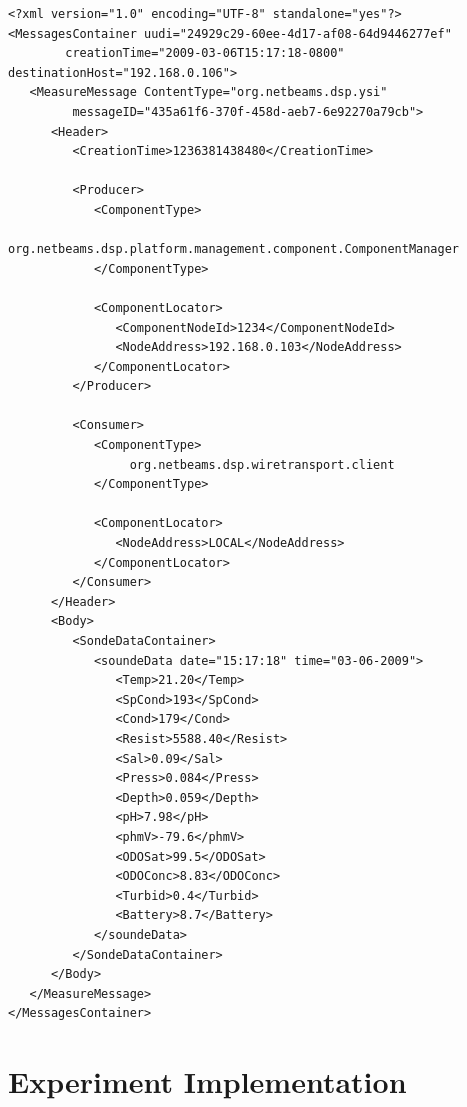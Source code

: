 \begin{lstlisting}
<?xml version="1.0" encoding="UTF-8" standalone="yes"?>
<MessagesContainer uudi="24929c29-60ee-4d17-af08-64d9446277ef"
        creationTime="2009-03-06T15:17:18-0800" destinationHost="192.168.0.106">
   <MeasureMessage ContentType="org.netbeams.dsp.ysi"
         messageID="435a61f6-370f-458d-aeb7-6e92270a79cb">
      <Header>
         <CreationTime>1236381438480</CreationTime>
         
         <Producer>   
            <ComponentType>
                 org.netbeams.dsp.platform.management.component.ComponentManager
            </ComponentType>
            
            <ComponentLocator>
               <ComponentNodeId>1234</ComponentNodeId>
               <NodeAddress>192.168.0.103</NodeAddress>
            </ComponentLocator>
         </Producer>
         
         <Consumer>
            <ComponentType>
                 org.netbeams.dsp.wiretransport.client
            </ComponentType>
            
            <ComponentLocator>
               <NodeAddress>LOCAL</NodeAddress>
            </ComponentLocator>
         </Consumer>
      </Header>
      <Body>
         <SondeDataContainer>
            <soundeData date="15:17:18" time="03-06-2009">  
               <Temp>21.20</Temp>
               <SpCond>193</SpCond>
               <Cond>179</Cond>
               <Resist>5588.40</Resist>
               <Sal>0.09</Sal>
               <Press>0.084</Press>
               <Depth>0.059</Depth>
               <pH>7.98</pH>
               <phmV>-79.6</phmV>
               <ODOSat>99.5</ODOSat>
               <ODOConc>8.83</ODOConc>
               <Turbid>0.4</Turbid>
               <Battery>8.7</Battery>
            </soundeData>
         </SondeDataContainer>
      </Body>
   </MeasureMessage>
</MessagesContainer>
\end{lstlisting}

\section{Experiment Implementation}




